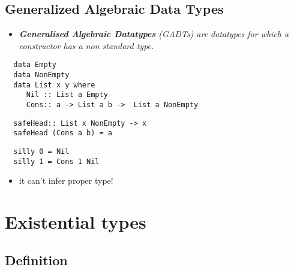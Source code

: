 \documentclass[aspectratio=43]{beamer}
\begin{document}
\subsection{Generalized Algebraic Data Types}

\begin{frame}[fragile]
 \begin{itemize}
  \item \textit{\textbf{Generalised Algebraic Datatypes} (GADTs) are datatypes for which a constructor has a non standard type.}
 \end{itemize}
 \pause
 \begin{lstlisting}
  data Empty
  data NonEmpty
  data List x y where
     Nil :: List a Empty
     Cons:: a -> List a b ->  List a NonEmpty
 \end{lstlisting}
 \pause
 \begin{lstlisting}
  safeHead:: List x NonEmpty -> x
  safeHead (Cons a b) = a
 \end{lstlisting}
 \pause
 \begin{lstlisting}
  silly 0 = Nil
  silly 1 = Cons 1 Nil
 \end{lstlisting}
 \pause
 \begin{itemize}
  \item it can't infer proper type!
 \end{itemize}
\end{frame}

\section{Existential types}

\subsection{Definition}
\end{document}
